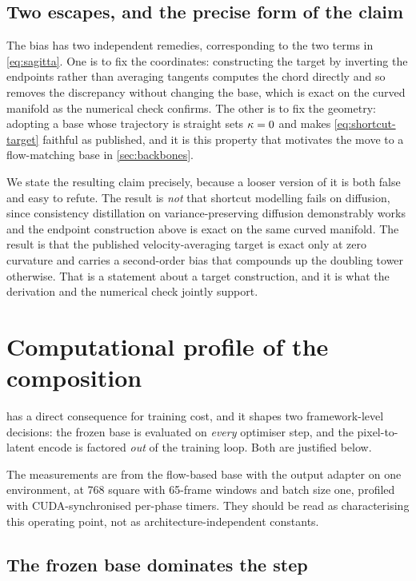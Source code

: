 \subsection{Two escapes, and the precise form of the claim}

The bias has two independent remedies, corresponding to the two terms in
\cref{eq:sagitta}. One is to fix the coordinates: constructing the target
by inverting the endpoints rather than averaging tangents computes the
chord directly and so removes the discrepancy without changing the base,
which is exact on the curved manifold as the numerical check confirms. The
other is to fix the geometry: adopting a base whose trajectory is straight
sets $\kappa = 0$ and makes \cref{eq:shortcut-target} faithful as published,
and it is this property that motivates the move to a flow-matching base in
\cref{sec:backbones}.

We state the resulting claim precisely, because a looser version of it is
both false and easy to refute. The result is \emph{not} that shortcut
modelling fails on diffusion, since consistency distillation on
variance-preserving diffusion demonstrably works and the endpoint
construction above is exact on the same curved manifold. The result is that
the published velocity-averaging target is exact only at zero curvature and
carries a second-order bias that compounds up the doubling tower otherwise.
That is a statement about a target construction, and it is what the
derivation and the numerical check jointly support.

\section{Computational profile of the composition}
\label{sec:cost}

 has a direct consequence for training cost, and it
shapes two framework-level decisions: the frozen base is evaluated on
\emph{every} optimiser step, and the pixel-to-latent encode is factored
\emph{out} of the training loop. Both are justified below.

The measurements are from the flow-based base with the output adapter on one
environment, at \SI{768}{\pixel} square with 65-frame windows and batch size
one, profiled with CUDA-synchronised per-phase timers. They should be read
as characterising this operating point, not as
architecture-independent constants.

\subsection{The frozen base dominates the step}

